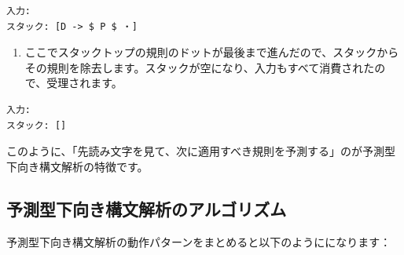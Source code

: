 \begin{verbatim}
入力:
スタック: [D -> $ P $ ・]
\end{verbatim}

\begin{enumerate}
\def\labelenumi{\arabic{enumi}.}
\setcounter{enumi}{13}
\tightlist
\item
  ここでスタックトップの規則のドットが最後まで進んだので、スタックからその規則を除去します。スタックが空になり、入力もすべて消費されたので、受理されます。
\end{enumerate}

\begin{verbatim}
入力:
スタック: []
\end{verbatim}

このように、「先読み文字を見て、次に適用すべき規則を予測する」のが予測型下向き構文解析の特徴です。

\hypertarget{chapter5-ux4e88ux6e2cux578bux4e0bux5411ux304dux69cbux6587ux89e3ux6790ux306eux30a2ux30ebux30b4ux30eaux30baux30e0}{%
\subsection{予測型下向き構文解析のアルゴリズム}\label{chapter5-ux4e88ux6e2cux578bux4e0bux5411ux304dux69cbux6587ux89e3ux6790ux306eux30a2ux30ebux30b4ux30eaux30baux30e0}}

予測型下向き構文解析の動作パターンをまとめると以下のようにになります：

